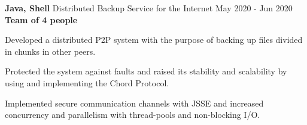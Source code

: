\cventry
  {\textbf{Java, Shell}} %
  {Distributed Backup Service for the Internet \href{https://github.com/EduRibeiro00/DistBackupService-feup-sdis}{\faExternalLink}} %
  {May 2020 - Jun 2020} %
  {\textbf{Team of 4 people}} %
  {
    \begin{cvitems} %
      \item {Developed a distributed P2P system with the purpose of backing up files divided in chunks in other peers.}
      \item{Protected the system against faults and raised its stability and scalability by using and implementing the Chord Protocol.}
      \item {Implemented secure communication channels with JSSE and increased concurrency and parallelism with thread-pools and non-blocking I/O.}
    \end{cvitems}
  }